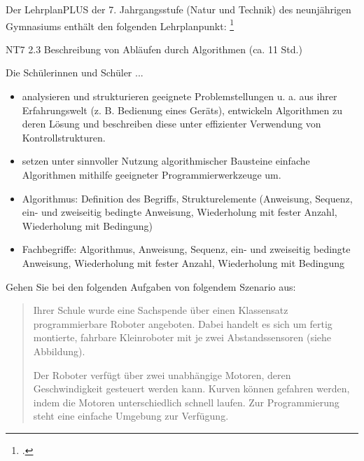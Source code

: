 \documentclass{bschlangaul-aufgabe}
\begin{document}

Der LehrplanPLUS der 7. Jahrgangsstufe (Natur und Technik) des
neunjährigen Gymnasiums enthält den folgenden Lehrplanpunkt:
\footcite{examen:66118:2021:03}

\begin{liKasten}
NT7 2.3 Beschreibung von Abläufen durch Algorithmen (ca. 11 Std.)


Die Schülerinnen und Schüler ...

\begin{itemize}
\item analysieren und strukturieren geeignete Problemstellungen u. a.
aus ihrer Erfahrungswelt (z. B. Bedienung eines Geräts), entwickeln
Algorithmen zu deren Lösung und beschreiben diese unter effizienter
Verwendung von Kontrollstrukturen.

\item setzen unter sinnvoller Nutzung algorithmischer Bausteine einfache
Algorithmen mithilfe geeigneter Programmierwerkzeuge um.
\end{itemize}


\begin{itemize}
\item Algorithmus: Definition des Begriffs, Strukturelemente (Anweisung,
Sequenz, ein- und zweiseitig bedingte Anweisung, Wiederholung mit fester
Anzahl, Wiederholung mit Bedingung)

\item Fachbegriffe: Algorithmus, Anweisung, Sequenz, ein- und zweiseitig
bedingte Anweisung, Wiederholung mit fester Anzahl, Wiederholung mit
Bedingung
\end{itemize}
\end{liKasten}


\noindent
Gehen Sie bei den folgenden Aufgaben von folgendem Szenario aus:

\begin{quote}
Ihrer Schule wurde eine Sachspende über einen Klassensatz
programmierbare Roboter angeboten. Dabei handelt es sich um fertig
montierte, fahrbare Kleinroboter mit je zwei Abstandssensoren (siehe
Abbildung).

Der Roboter verfügt über zwei unabhängige Motoren, deren Geschwindigkeit
gesteuert werden kann. Kurven können gefahren werden, indem die Motoren
unterschiedlich schnell laufen. Zur Programmierung steht eine einfache
Umgebung zur Verfügung.
\end{quote}
\end{document}
